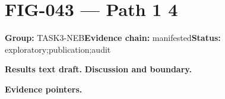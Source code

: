 \clearpage
\section{FIG-043 --- Path 1 4}
\label{figpage:fig-043}
\textbf{Group:} TASK3-NEB\quad \textbf{Evidence chain:} manifested\quad \textbf{Status:} exploratory;publication;audit

\textbf{Results text draft.} 
\textbf{Discussion and boundary.} 


\textbf{Evidence pointers.}



\vfill
